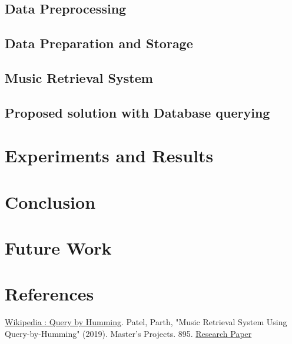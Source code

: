 \documentclass[conference]{IEEEtran}
\begin{document}
\subsection{Data Preprocessing}
\subsection{Data Preparation and Storage}
\subsection{Music Retrieval System}
\subsection{Proposed solution with Database querying}

\section{Experiments and Results}

\section{Conclusion}

\section{Future Work}

\section{References}

\begin{thebibliography}{00}
 \href{https://en.wikipedia.org/wiki/Query_by_humming}{Wikipedia : Query by Humming}.
 Patel, Parth, "Music Retrieval System Using Query-by-Humming" (2019). Master's Projects. 895.
\href{https://scholarworks.sjsu.edu/etd_projects/895}{Research Paper}

\end{thebibliography}
\vspace{12pt}
\end{document}
